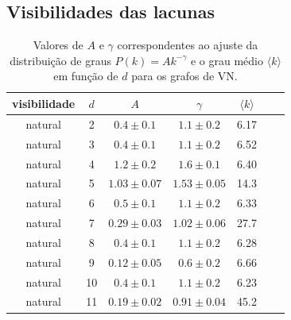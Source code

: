 \documentclass[12pt,
aspectratio=169,
]{beamer}
\begin{document}
\subsection{Visibilidades das lacunas}
\begin{nobarframe}

\begin{table}[h!]
\begin{center}
\caption{Valores de $A$ e $\gamma$ correspondentes ao ajuste da distribuição de graus
$P(k)=A k^{-\gamma}$ e o grau médio $\langle k \rangle $ em função de $d$
para os grafos de VN.}
\begin{tabular}{|c|c|c|c|c|c|c|}\hline
        visibilidade & $d$ & $A$ & $\gamma$  & $\langle k \rangle $ \\
        \hline
        natural & 2 & $0.4 \pm 0.1$  & $1.1 \pm 0.2$ & 6.17 \\
        natural & 3 & $0.4 \pm 0.1$  & $1.1 \pm 0.2$ & 6.52 \\
        natural & 4 & $1.2 \pm 0.2$  & $1.6 \pm 0.1$ & 6.40 \\
        natural & 5 & $1.03 \pm 0.07$ & $1.53 \pm 0.05$ & 14.3 \\
        natural & 6 & $0.5 \pm 0.1$ & $1.1 \pm 0.2$ & 6.33 \\
natural & 7 & $0.29 \pm 0.03$ & $1.02 \pm 0.06$ & 27.7 \\
natural & 8 & $0.4 \pm 0.1$ & $1.1 \pm 0.2$ & 6.28 \\
natural & 9 & $0.12 \pm 0.05$ & $0.6 \pm 0.2$ & 6.66 \\
natural & 10 & $0.4 \pm 0.1$ & $1.1 \pm 0.2$ & 6.23 \\
natural & 11 & $0.19 \pm 0.02$ & $0.91 \pm 0.04$ & 45.2 \\
        \hline
    \end{tabular}
    \label{tab:natural-stats}
\end{center}
\end{table}
\end{nobarframe}
\end{document}

